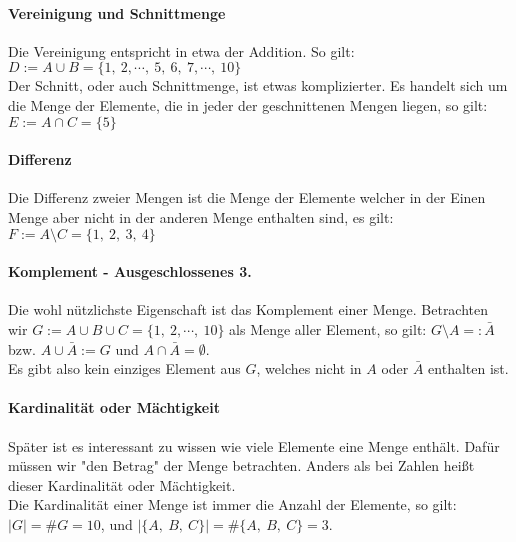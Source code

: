 \paragraph{Vereinigung und Schnittmenge}$ $\\
Die Vereinigung entspricht in etwa der Addition. So gilt: $D:=A\cup B=\{1,\ 2,\cdots,\ 5,\ 6,\ 7,\cdots,\ 10\}$\\
Der Schnitt, oder auch Schnittmenge, ist etwas komplizierter. Es handelt sich um die Menge der Elemente, die in jeder der geschnittenen Mengen liegen, so gilt: $E:=A\cap C=\{5\}$\\
\paragraph{Differenz}$ $\\
Die Differenz zweier Mengen ist die Menge der Elemente welcher in der Einen Menge aber nicht in der anderen Menge enthalten sind, es gilt: $F:=A\setminus C=\{1,\ 2,\ 3,\ 4\}$\\
\paragraph{Komplement - Ausgeschlossenes 3.}$ $\\
Die wohl nützlichste Eigenschaft ist das Komplement einer Menge. Betrachten wir $G:=A\cup B\cup C=\{1,\ 2,\cdots,\ 10\}$ als Menge aller Element, so gilt: $G\setminus A=:\bar{A}$ bzw. $A\cup\bar{A}:=G$ und $A\cap\bar{A}=\emptyset$.\\
Es gibt also kein einziges Element aus $G$, welches nicht in $A$ oder $\bar{A}$ enthalten ist.\\ 

\paragraph{Kardinalität oder Mächtigkeit}$ $\\
Später ist es interessant zu wissen wie viele Elemente eine Menge enthält. Dafür müssen wir "den Betrag"  der Menge betrachten. Anders als bei Zahlen heißt dieser Kardinalität oder Mächtigkeit.\\
Die Kardinalität einer Menge ist immer die Anzahl der Elemente, so gilt: $\vert G\vert=\# G=10$, und $\vert\{A,\ B,\ C\}\vert=\# \{A,\ B,\ C\}=3$.\\
